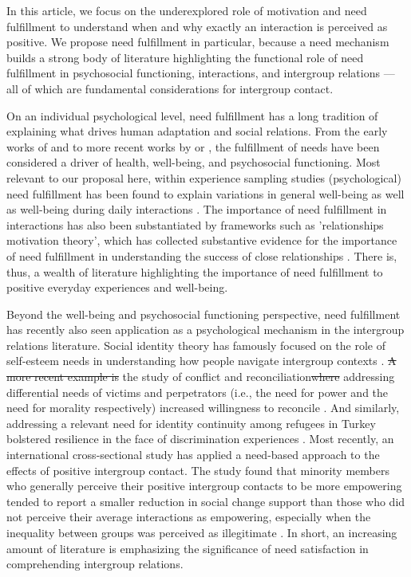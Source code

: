 \documentclass[man, 12pt, a4paper, mask]{apa7}
\theoremstyle{break}
\theoremstyle{plain}
\providecommand{\DIFaddtex}[1]{{\protect\color{blue}\uwave{#1}}} %
\providecommand{\DIFdeltex}[1]{{\protect\color{red}\sout{#1}}}                      %
\providecommand{\DIFaddbegin}{} %
\providecommand{\DIFaddend}{} %
\providecommand{\DIFdelbegin}{} %
\providecommand{\DIFdelend}{} %
\providecommand{\DIFadd}[1]{\texorpdfstring{\DIFaddtex{#1}}{#1}} %
\providecommand{\DIFdel}[1]{\texorpdfstring{\DIFdeltex{#1}}{}} %
\newcommand{\DIFscaledelfig}{0.5}
\newlength{\DIFdelgraphicswidth} %
\newlength{\DIFdelgraphicsheight} %
\newcommand{\DIFaddincludegraphics}[2][]{{\color{blue}\fbox{\DIFOincludegraphics[#1]{#2}}}} %
\newcommand{\DIFdelincludegraphics}[2][]{%
\sbox{\DIFdelgraphicsbox}{\DIFOincludegraphics[#1]{#2}}%
\settoboxwidth{\DIFdelgraphicswidth}{\DIFdelgraphicsbox} %
\settoboxtotalheight{\DIFdelgraphicsheight}{\DIFdelgraphicsbox} %
\scalebox{\DIFscaledelfig}{%
\parbox[b]{\DIFdelgraphicswidth}{\usebox{\DIFdelgraphicsbox}\\[-\baselineskip] \rule{\DIFdelgraphicswidth}{0em}}\llap{\resizebox{\DIFdelgraphicswidth}{\DIFdelgraphicsheight}{%
\setlength{\unitlength}{\DIFdelgraphicswidth}%
\begin{picture}(1,1)%
\thicklines\linethickness{2pt} %
{\color[rgb]{1,0,0}\put(0,0){\framebox(1,1){}}}%
{\color[rgb]{1,0,0}\put(0,0){\line( 1,1){1}}}%
{\color[rgb]{1,0,0}\put(0,1){\line(1,-1){1}}}%
\end{picture}%
}\hspace*{3pt}}} %
} %
\DeclareRobustCommand{\DIFaddbegin}{\DIFOaddbegin \let\includegraphics\DIFaddincludegraphics} %
\DeclareRobustCommand{\DIFaddend}{\DIFOaddend \let\includegraphics\DIFOincludegraphics} %
\DeclareRobustCommand{\DIFdelbegin}{\DIFOdelbegin \let\includegraphics\DIFdelincludegraphics} %
\DeclareRobustCommand{\DIFdelend}{\DIFOaddend \let\includegraphics\DIFOincludegraphics} %
\begin{document}
In this article, we focus on the underexplored role of motivation and need fulfillment to understand when and why exactly an interaction is perceived as positive. We propose need fulfillment in particular, because a need mechanism builds a strong body of literature highlighting the functional role of need fulfillment in psychosocial functioning, interactions, and intergroup relations --- all of which are fundamental considerations for intergroup contact.

On an individual psychological level, need fulfillment has a long tradition of explaining what drives human adaptation and social relations. From the early works of \citet[][]{maslow1943} and \citet[][]{lewin1926e} to more recent works by \citet[][]{Ryan2017} or \citet[][]{Steverink2006}, the fulfillment of needs have been considered a driver of health, well-being, and psychosocial functioning. Most relevant to our proposal here, within experience sampling studies (psychological) need fulfillment has been found to explain variations in general well-being \citep[e.g.,][]{sheldon1996, reis2000} as well as well-being during daily interactions \citep[][]{Downie2008}. The importance of need fulfillment in interactions has also been substantiated by frameworks such as 'relationships motivation theory', which has collected substantive evidence for the importance of need fulfillment in understanding the success of close relationships \citep[e.g., see][]{knee2023}. There is, thus, a wealth of literature highlighting the importance of need fulfillment to positive everyday experiences and well-being.

Beyond the well-being and psychosocial functioning perspective, need fulfillment has recently also seen application as a psychological mechanism in the intergroup relations literature. Social identity theory has famously focused on the role of self-esteem needs in understanding how people navigate intergroup contexts \citep[e.g.,][]{abrams1988}. \DIFdelbegin \DIFdel{A more recent example is }\DIFdelend \DIFaddbegin \DIFadd{In }\DIFaddend the study of conflict and reconciliation\DIFdelbegin \DIFdel{where }\DIFdelend \DIFaddbegin \DIFadd{, }\DIFaddend addressing differential needs of victims and perpetrators (i.e., the need for power and the need for morality respectively) increased willingness to reconcile \citep[][]{Shnabel2008}. And similarly, addressing a relevant need for identity continuity among refugees in Turkey bolstered resilience in the face of discrimination experiences \citep[][]{Celebi2017}. Most recently, an international cross-sectional study has applied a need-based approach to the effects of positive intergroup contact. The study found that minority members who generally perceive their positive intergroup contacts to be more empowering tended to report a smaller reduction in social change support than those who did not perceive their average interactions as empowering, especially when the inequality between groups was perceived as illegitimate \citep[][]{Hassler2021}. In short, an increasing amount of literature is emphasizing the significance of need satisfaction in comprehending intergroup relations.
\end{document}
